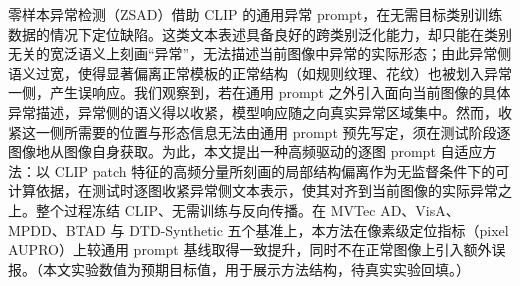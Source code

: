 零样本异常检测（ZSAD）借助 CLIP 的通用异常 prompt，在无需目标类别训练数据的情况下定位缺陷。这类文本表述具备良好的跨类别泛化能力，却只能在类别无关的宽泛语义上刻画“异常”，无法描述当前图像中异常的实际形态；由此异常侧语义过宽，使得显著偏离正常模板的正常结构（如规则纹理、花纹）也被划入异常一侧，产生误响应。我们观察到，若在通用 prompt 之外引入面向当前图像的具体异常描述，异常侧的语义得以收紧，模型响应随之向真实异常区域集中。然而，收紧这一侧所需要的位置与形态信息无法由通用 prompt 预先写定，须在测试阶段逐图像地从图像自身获取。为此，本文提出一种高频驱动的逐图 prompt 自适应方法：以 CLIP patch 特征的高频分量所刻画的局部结构偏离作为无监督条件下的可计算依据，在测试时逐图收紧异常侧文本表示，使其对齐到当前图像的实际异常之上。整个过程冻结 CLIP、无需训练与反向传播。在 MVTec AD、VisA、MPDD、BTAD 与 DTD-Synthetic 五个基准上，本方法在像素级定位指标（pixel AUPRO）上较通用 prompt 基线取得一致提升，同时不在正常图像上引入额外误报。（本文实验数值为预期目标值，用于展示方法结构，待真实实验回填。）
